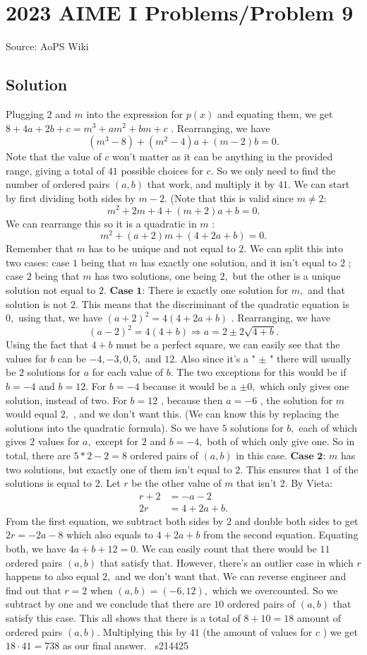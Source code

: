 \documentclass[12pt]{article}
\begin{document}
\section*{{2023 AIME I Problems/Problem 9}}
Source: AoPS Wiki

\subsection*{Solution}
Plugging $2$ and $m$ into the expression for $p(x)$ and equating them, we get $8+4a+2b+c = m^3+am^2+bm+c$ . Rearranging, we have \[(m^3-8) + (m^2 - 4)a + (m-2)b = 0.\] Note that the value of $c$ won't matter as it can be anything in the provided range, giving a total of $41$ possible choices for $c.$ So we only need to find the number of ordered pairs $(a, b)$ that work, and multiply it by $41.$ We can start by first dividing both sides by $m-2.$ (Note that this is valid since $m\neq2:$ \[m^2 + 2m + 4 + (m+2)a + b = 0.\] We can rearrange this so it is a quadratic in $m$ : \[m^2 + (a+2)m + (4 + 2a + b) = 0.\] Remember that $m$ has to be unique and not equal to $2.$ We can split this into two cases: case $1$ being that $m$ has exactly one solution, and it isn't equal to $2$ ; case $2$ being that $m$ has two solutions, one being $2,$ but the other is a unique solution not equal to $2.$ $\textbf{Case 1:}$ There is exactly one solution for $m,$ and that solution is not $2.$ This means that the discriminant of the quadratic equation is $0,$ using that, we have $(a+2)^2 = 4(4 + 2a + b)$ . Rearranging, we have \[(a-2)^2 = 4(4 + b)\Longrightarrow a = 2\pm2\sqrt{4+b}.\] Using the fact that $4+b$ must be a perfect square, we can easily see that the values for $b$ can be $-4, -3, 0, 5,$ and $12.$ Also since it's a " $\pm$ " there will usually be $2$ solutions for $a$ for each value of $b.$ The two exceptions for this would be if $b = -4$ and $b = 12.$ For $b=-4$ because it would be a $\pm0,$ which only gives one solution, instead of two. For $b=12$ , because then $a = -6$ , the solution for $m$ would equal $2,$ , and we don't want this. (We can know this by replacing the solutions into the quadratic formula). So we have $5$ solutions for $b,$ each of which gives $2$ values for $a,$ except for $2$ and $b = -4,$ both of which only give one. So in total, there are $5*2 - 2 = 8$ ordered pairs of $(a,b)$ in this case. $\textbf{Case 2:}$ $m$ has two solutions, but exactly one of them isn't equal to $2.$ This ensures that $1$ of the solutions is equal to $2.$ Let $r$ be the other value of $m$ that isn't $2.$ By Vieta: \begin{align*} r+2 &= -a-2\\ 2r &= 4+2a+b. \end{align*} From the first equation, we subtract both sides by $2$ and double both sides to get $2r = -2a - 8$ which also equals to $4+2a+b$ from the second equation. Equating both, we have $4a + b + 12 = 0.$ We can easily count that there would be $11$ ordered pairs $(a,b)$ that satisfy that. However, there's an outlier case in which $r$ happens to also equal $2,$ and we don't want that. We can reverse engineer and find out that $r=2$ when $(a,b) = (-6, 12),$ which we overcounted. So we subtract by one and we conclude that there are $10$ ordered pairs of $(a,b)$ that satisfy this case. This all shows that there is a total of $8+10 = 18$ amount of ordered pairs $(a,b).$ Multiplying this by $41$ (the amount of values for $c$ ) we get $18\cdot41=\boxed{738}$ as our final answer. ~s214425
\end{document}
